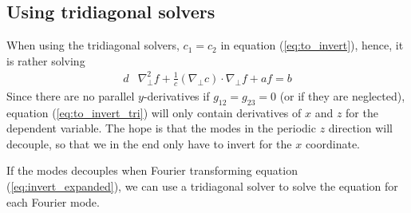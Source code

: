 \subsection{Using tridiagonal solvers}
%
When using the tridiagonal solvers, $c_1 = c_2$ in equation (\ref{eq:to_invert}), hence, it is rather solving
%
\begin{align}
    d&\nabla_\perp^2f + \frac{1}{c}(\nabla_\perp c)\cdot\nabla_\perp f + af = b
%
\label{eq:to_invert_tri}
%
\end{align}
%
Since there are no parallel $y$-derivatives if $g_{12}=g_{23}=0$ (or if they are neglected), equation (\ref{eq:to_invert_tri}) will only contain derivatives of $x$ and $z$ for the dependent variable.
The hope is that the modes in the periodic $z$ direction will decouple, so that we in the end only have to invert for the $x$ coordinate.

If the modes decouples when Fourier transforming equation (\ref{eq:invert_expanded}), we can use a tridiagonal solver to solve the equation for each Fourier mode.

